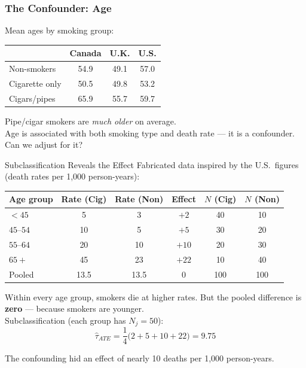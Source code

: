 \documentclass[xcolor=dvipsnames]{beamer}
\begin{document}
\begin{frame}
  \frametitle{The Confounder: Age}
\small
Mean ages by smoking group:

\begin{center}
\begin{tabular}{@{} l c c c @{}}
\toprule
 & Canada & U.K. & U.S.\\
\midrule
Non-smokers     & 54.9 & 49.1 & 57.0 \\
Cigarette only  & 50.5 & 49.8 & 53.2 \\
Cigars/pipes    & 65.9 & 55.7 & 59.7 \\
\bottomrule
\end{tabular}
\end{center}

\bigskip
{} Pipe/cigar smokers are \textit{much older} on average.\\
\medskip
{} Age is associated with both smoking type and death rate --- it is a confounder.  Can we adjust for it?
\end{frame}


\begin{frame}{Subclassification Reveals the Effect}
\small
{} Fabricated data inspired by the U.S.\ figures (death rates per 1,000 person-years):

\begin{center}
\footnotesize
\begin{tabular}{@{} l c c c c c @{}}
\toprule
Age group & Rate (Cig) & Rate (Non) & Effect & $N$ (Cig) & $N$ (Non) \\
\midrule
$<45$    & 5  & 3  & $+2$  & 40 & 10 \\
$45$--$54$ & 10 & 5  & $+5$  & 30 & 20 \\
$55$--$64$ & 20 & 10 & $+10$ & 20 & 30 \\
$65+$    & 45 & 23 & $+22$ & 10 & 40 \\
\midrule
Pooled   & 13.5 & 13.5 & $0$ & 100 & 100 \\
\bottomrule
\end{tabular}
\end{center}

 Within every age group, smokers die at higher rates.  But the pooled difference is \textbf{zero} --- because smokers are younger.\\

\medskip
{} Subclassification (each group has $N_j = 50$):
$$\hat\tau_{ATE} = \frac{1}{4}\big(2 + 5 + 10 + 22\big) = 9.75$$

 The confounding hid an effect of nearly 10 deaths per 1,000 person-years.
\end{frame}
\end{document}
